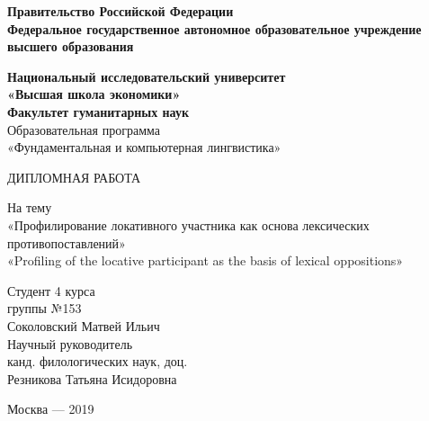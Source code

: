 \thispagestyle{empty}
\begin{center}
\noindent 
\textbf{Правительство Российской Федерации \\Федеральное государственное автономное образовательное учреждение высшего образования}

\textbf{Национальный исследовательский университет}\\
\textbf{«Высшая школа экономики»}\\
\textbf{Факультет гуманитарных наук}\bigskip\\
\vfill
Образовательная программа \\
  «Фундаментальная и компьютерная лингвистика»\\
\vfill

\huge{ДИПЛОМНАЯ РАБОТА}\\
\large

На тему \\
\Large
«Профилирование локативного участника как основа лексических противопоставлений»\\
«Profiling of the locative participant as the basis of lexical oppositions»\\
\vfill
\vfill
\normalsize
\begin{flushright}
Студент 4 курса\\
группы №153 \\
Соколовский Матвей Ильич\bigskip\\
                       
Научный руководитель\\
канд. филологических наук, доц.\\
Резникова Татьяна Исидоровна\\

\end{flushright}
\vfill
\begin{center}
Москва --- 2019
\end{center}

\end{center}
\pagebreak